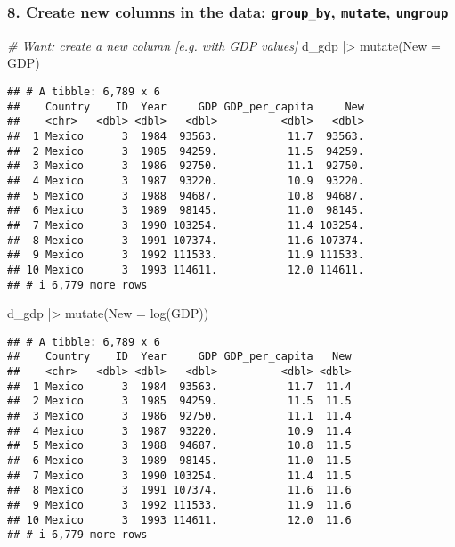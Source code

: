 \documentclass[
]{article}
\newenvironment{Shaded}{\begin{snugshade}}{\end{snugshade}}
\newcommand{\AttributeTok}[1]{\textcolor[rgb]{0.77,0.63,0.00}{#1}}
\newcommand{\CommentTok}[1]{\textcolor[rgb]{0.56,0.35,0.01}{\textit{#1}}}
\newcommand{\FunctionTok}[1]{\textcolor[rgb]{0.00,0.00,0.00}{#1}}
\newcommand{\NormalTok}[1]{#1}
\newcommand{\SpecialCharTok}[1]{\textcolor[rgb]{0.00,0.00,0.00}{#1}}
\begin{document}
\hypertarget{create-new-columns-in-the-data-group_by-mutate-ungroup}{%
\subsubsection{\texorpdfstring{8. Create new columns in the data:
\texttt{group\_by}, \texttt{mutate},
\texttt{ungroup}}{8. Create new columns in the data: group\_by, mutate, ungroup}}\label{create-new-columns-in-the-data-group_by-mutate-ungroup}}

\begin{Shaded}
\begin{Highlighting}[]
\CommentTok{\# Want: create a new column [e.g. with GDP values]}
\NormalTok{d\_gdp }\SpecialCharTok{|\textgreater{}} 
  \FunctionTok{mutate}\NormalTok{(}\AttributeTok{New =}\NormalTok{ GDP)}
\end{Highlighting}
\end{Shaded}

\begin{verbatim}
## # A tibble: 6,789 x 6
##    Country    ID  Year     GDP GDP_per_capita     New
##    <chr>   <dbl> <dbl>   <dbl>          <dbl>   <dbl>
##  1 Mexico      3  1984  93563.           11.7  93563.
##  2 Mexico      3  1985  94259.           11.5  94259.
##  3 Mexico      3  1986  92750.           11.1  92750.
##  4 Mexico      3  1987  93220.           10.9  93220.
##  5 Mexico      3  1988  94687.           10.8  94687.
##  6 Mexico      3  1989  98145.           11.0  98145.
##  7 Mexico      3  1990 103254.           11.4 103254.
##  8 Mexico      3  1991 107374.           11.6 107374.
##  9 Mexico      3  1992 111533.           11.9 111533.
## 10 Mexico      3  1993 114611.           12.0 114611.
## # i 6,779 more rows
\end{verbatim}

\begin{Shaded}
\begin{Highlighting}[]
\NormalTok{d\_gdp }\SpecialCharTok{|\textgreater{}} 
  \FunctionTok{mutate}\NormalTok{(}\AttributeTok{New =} \FunctionTok{log}\NormalTok{(GDP))}
\end{Highlighting}
\end{Shaded}

\begin{verbatim}
## # A tibble: 6,789 x 6
##    Country    ID  Year     GDP GDP_per_capita   New
##    <chr>   <dbl> <dbl>   <dbl>          <dbl> <dbl>
##  1 Mexico      3  1984  93563.           11.7  11.4
##  2 Mexico      3  1985  94259.           11.5  11.5
##  3 Mexico      3  1986  92750.           11.1  11.4
##  4 Mexico      3  1987  93220.           10.9  11.4
##  5 Mexico      3  1988  94687.           10.8  11.5
##  6 Mexico      3  1989  98145.           11.0  11.5
##  7 Mexico      3  1990 103254.           11.4  11.5
##  8 Mexico      3  1991 107374.           11.6  11.6
##  9 Mexico      3  1992 111533.           11.9  11.6
## 10 Mexico      3  1993 114611.           12.0  11.6
## # i 6,779 more rows
\end{verbatim}
\end{document}
